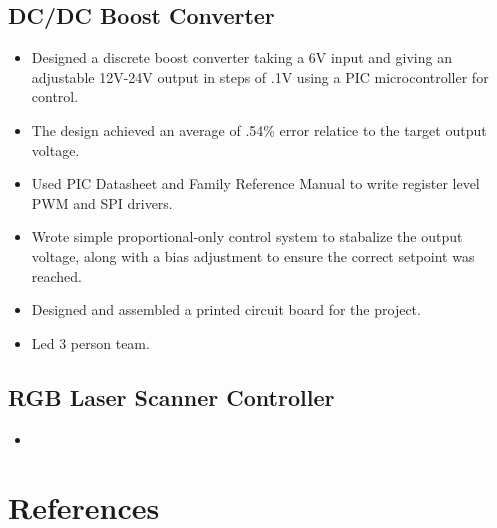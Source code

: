 \documentclass{article}
\begin{document}
\begin{spacing}{.5}
	\subsection{DC/DC Boost Converter \hfill {}}
		\begin{itemize}[label=--,itemsep=-.35ex]
			\item \large{Designed a discrete boost converter taking a 6V input and giving an adjustable 12V-24V output in steps of .1V using a PIC microcontroller for control.}
			\item \large{The design achieved an average of .54\% error relatice to the target output voltage.}
			\item \large{Used PIC Datasheet and Family Reference Manual to write register level PWM and SPI drivers.}
			\item \large{Wrote simple proportional-only control system to stabalize the output voltage, along with a bias adjustment to ensure the correct setpoint was reached.}
			\item \large{Designed and assembled a printed circuit board for the project.}
			\item \large{Led 3 person team.}
		\end{itemize}
	\subsection{RGB Laser Scanner Controller}
		\begin{itemize}[label=--,itemsep=-.75ex]
			\item \large{}
		\end{itemize}

\section{References}

\end{spacing}
\end{document}
